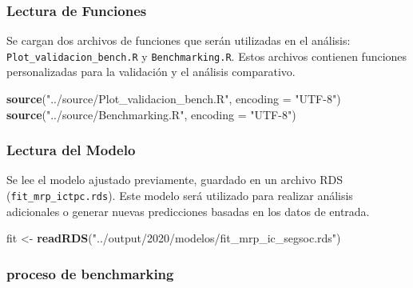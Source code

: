\documentclass[
  12pt,
]{book}
\newenvironment{Shaded}{\begin{snugshade}}{\end{snugshade}}
\newcommand{\AttributeTok}[1]{\textcolor[rgb]{0.13,0.29,0.53}{#1}}
\newcommand{\FunctionTok}[1]{\textcolor[rgb]{0.13,0.29,0.53}{\textbf{#1}}}
\newcommand{\NormalTok}[1]{#1}
\newcommand{\OtherTok}[1]{\textcolor[rgb]{0.56,0.35,0.01}{#1}}
\newcommand{\StringTok}[1]{\textcolor[rgb]{0.31,0.60,0.02}{#1}}
\begin{document}
\hypertarget{lectura-de-funciones-2}{%
\subsubsection*{Lectura de Funciones}\label{lectura-de-funciones-2}}

Se cargan dos archivos de funciones que serán utilizadas en el análisis: \texttt{Plot\_validacion\_bench.R} y \texttt{Benchmarking.R}. Estos archivos contienen funciones personalizadas para la validación y el análisis comparativo.

\begin{Shaded}
\begin{Highlighting}[]
\FunctionTok{source}\NormalTok{(}\StringTok{"../source/Plot\_validacion\_bench.R"}\NormalTok{, }\AttributeTok{encoding =} \StringTok{"UTF{-}8"}\NormalTok{)}
\FunctionTok{source}\NormalTok{(}\StringTok{"../source/Benchmarking.R"}\NormalTok{, }\AttributeTok{encoding =} \StringTok{"UTF{-}8"}\NormalTok{)}
\end{Highlighting}
\end{Shaded}

\hypertarget{lectura-del-modelo-2}{%
\subsubsection*{Lectura del Modelo}\label{lectura-del-modelo-2}}

Se lee el modelo ajustado previamente, guardado en un archivo RDS (\texttt{fit\_mrp\_ictpc.rds}). Este modelo será utilizado para realizar análisis adicionales o generar nuevas predicciones basadas en los datos de entrada.

\begin{Shaded}
\begin{Highlighting}[]
\NormalTok{fit }\OtherTok{\textless{}{-}} \FunctionTok{readRDS}\NormalTok{(}\StringTok{"../output/2020/modelos/fit\_mrp\_ic\_segsoc.rds"}\NormalTok{)}
\end{Highlighting}
\end{Shaded}

\hypertarget{proceso-de-benchmarking-2}{%
\subsubsection*{proceso de benchmarking}\label{proceso-de-benchmarking-2}}
\end{document}
